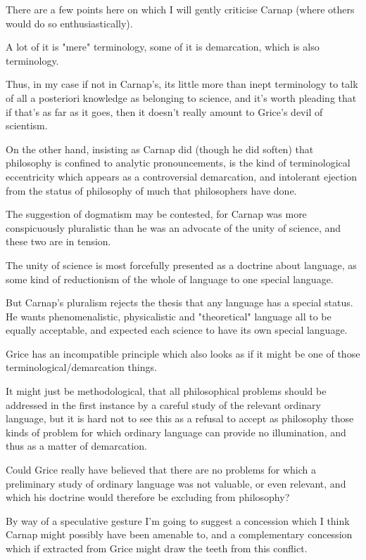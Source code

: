 \documentclass[10pt,titlepage]{book}
\begin{document}
There are a few points here on which I will gently criticise Carnap (where others would do so enthusiastically).

A lot of it is "mere" terminology, some of it is demarcation, which is also terminology.

Thus, in my case if not in Carnap's, its little more than inept terminology to talk of all a posteriori knowledge as belonging to science, and it's worth pleading that if that's as far as it goes, then it doesn't really amount to Grice's devil of scientism.

On the other hand, insisting as Carnap did (though he did soften) that philosophy is confined to analytic pronouncements, is the kind of terminological eccentricity which appears as a controversial demarcation, and intolerant ejection from the status of philosophy of much that philosophers have done.

The suggestion of dogmatism may be contested, for Carnap was more conspicuously pluralistic than he was an advocate of the unity of science, and these two are in tension.

The unity of science is most forcefully presented as a doctrine about language, as some kind of reductionism of the whole of language to one special language.

But Carnap's pluralism rejects the thesis that any language has a special status. He wants phenomenalistic, physicalistic and "theoretical" language all to be equally acceptable, and expected each science to have its own special language.

Grice has an incompatible principle which also looks as if it might be one of those terminological/demarcation things.

It might just be methodological, that all philosophical problems should be addressed in the first instance by a careful study of the relevant ordinary language, but it is hard not to see this as a refusal to accept as philosophy those kinds of problem for which ordinary language can provide no illumination, and thus as a matter of demarcation.

Could Grice really have believed that there are no problems for which a preliminary study of ordinary language was not valuable, or even relevant, and which his doctrine would therefore be excluding from philosophy?

By way of a speculative gesture I'm going to suggest a concession which I think Carnap might possibly have been amenable to, and a complementary concession which if extracted from Grice might draw the teeth from this conflict.
\end{document}
